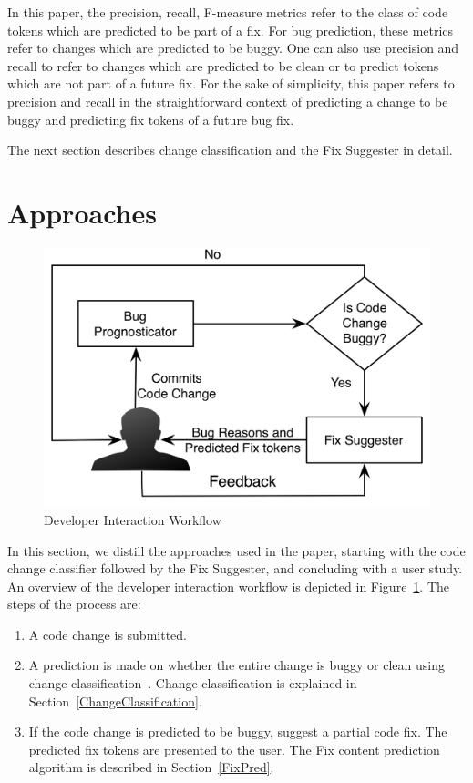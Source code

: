 \documentclass[conference]{IEEEtran}
\begin{document}
In this paper, the precision, recall, F-measure metrics refer to the class of code tokens which are predicted to be part of a fix. For bug prediction, these metrics refer to changes which are predicted to be buggy. One can also use precision and recall to refer to changes which are predicted to be clean or to predict tokens which are not part of a future fix. For the sake of simplicity, this paper refers to precision and recall in the straightforward context of predicting a change to be buggy and predicting fix tokens of a future bug fix.

The next section describes change classification and the Fix Suggester in detail. 

\section{Approaches}
\label{Approaches} 

\begin{figure}[t]
\begin{center}
 \includegraphics[scale=0.75]{pictures/HumanWorkflow.png}
\end{center}
\caption{Developer Interaction Workflow}
\label{workflow}
\end{figure}



In this section, we distill the approaches used in the paper, starting with the code change classifier followed by the Fix Suggester, and concluding with a user study. An overview of the developer interaction workflow is depicted in Figure~\ref{workflow}.
The steps of the process are:
\begin{enumerate}
\item A code change is submitted.
\item A prediction is made on whether the entire change is buggy or clean using change
classification~\cite{Kim2007p58, DBLP:journals/tse/ShivajiWAK13}. Change classification is explained in Section~\ref{ChangeClassification}.
\item If the code change is predicted to be buggy, suggest a partial code fix.
The predicted fix tokens are presented to the user. The Fix content prediction algorithm is described in
Section~\ref{FixPred}.

\end{enumerate}
\end{document}

